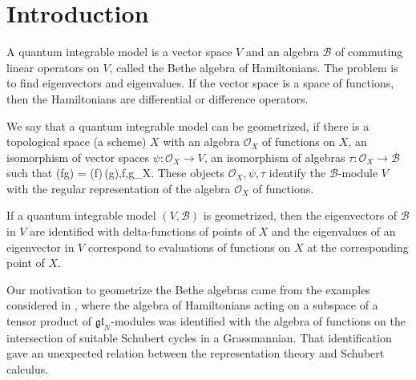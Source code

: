 \documentclass[12pt]{amsart}
\numberwithin{equation}{section}
\theoremstyle{definition}
\let\mc\mathcal
\def\B{{\mc B}}
\def\O{{\mc O}}
\def\O{{\mc O}}
\def\gln{\mathfrak{gl}_N}
\begin{document}
{\small\tableofcontents\par}

\setcounter{footnote}{0}
\renewcommand{\thefootnote}{\arabic{footnote}}





\section{Introduction}








A  quantum integrable model is a vector space  $V$
and an algebra $\B$ of commuting linear operators on $V$, 
 called  the Bethe algebra of Hamiltonians. 
The problem is to find eigenvectors and eigenvalues.
If the vector space is a space of functions, then the Hamiltonians are  differential or difference operators.

We say that a quantum integrable model can be geometrized,
 if there is a topological space (a scheme) $X$ with an algebra
$\O_X$ of functions on $X$,  an isomorphism of vector spaces $\psi :\O_X\to V$,  an isomorphism
of algebras $\tau:\O_X\to\B$ such that
\bea
\psi(fg) = \tau(f)\,\psi(g),\qquad \forall f,g\in\O_X.
\eea
These objects $\O_X, \psi,\tau$ identify the  $\B$-module $V$ with the regular representation of the algebra
  $\O_X$ of functions.
 


If a quantum integrable model $(V,\B)$ is geometrized, then the eigenvectors 
of $\B$ in $V$ are identified with delta-functions of points of $X$ and the eigenvalues of an eigenvector
in $ V$ correspond to evaluations of functions on $X$ at the corresponding  point of $X$.

\smallskip

Our motivation to geometrize the Bethe algebras  came from the examples
considered in \cite{MTV3, MTV5}, where the algebra of Hamiltonians acting on a subspace 
of a tensor product of $\gln$-modules was identified with the
algebra of functions on the intersection of suitable Schubert cycles in a 
Grassmannian. That identification gave an unexpected relation between the representation
theory and Schubert calculus. 

\smallskip
\end{document}
